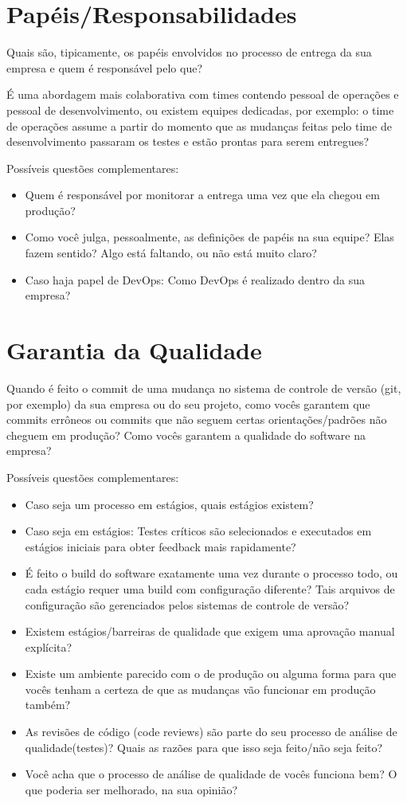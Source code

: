 \section{Papéis/Responsabilidades}
Quais são, tipicamente, os papéis envolvidos no processo de entrega da sua empresa e quem é responsável pelo que?


É uma abordagem mais colaborativa com times contendo pessoal de operações e pessoal de desenvolvimento, ou existem equipes dedicadas, por exemplo: o time de operações assume a partir do momento que as mudanças feitas pelo time de desenvolvimento passaram os testes e estão prontas para serem entregues?

Possíveis questões complementares:
\begin{itemize}
	\item Quem é responsável por monitorar a entrega uma vez que ela chegou em produção?
	\item Como você julga, pessoalmente, as definições de papéis na sua equipe? Elas fazem sentido? Algo está faltando, ou não está muito claro?
	\item Caso haja papel de DevOps: Como DevOps é realizado dentro da sua empresa?
\end{itemize}

\section{Garantia da Qualidade}

Quando é feito o commit de uma mudança no sistema de controle de versão (git, por exemplo) da sua empresa ou do seu projeto, como vocês garantem que commits errôneos ou commits que não seguem certas orientações/padrões não cheguem em produção? Como vocês garantem a qualidade do software na empresa?

Possíveis questões complementares:
\begin{itemize}
	\item Caso seja um processo em estágios, quais estágios existem?
	\item Caso seja em estágios: Testes críticos são selecionados e executados em estágios iniciais para obter feedback mais rapidamente?
	\item É feito o build do software exatamente uma vez durante o processo todo, ou cada estágio requer uma build com configuração diferente? Tais arquivos de configuração são gerenciados pelos sistemas de controle de versão?
	\item Existem estágios/barreiras de qualidade que exigem uma aprovação manual explícita?
	\item Existe um ambiente parecido com o de produção ou alguma forma para que vocês tenham a certeza de que as mudanças vão funcionar em produção também?
	\item As revisões de código (code reviews) são parte do seu processo de análise de qualidade(testes)? Quais as razões para que isso seja feito/não seja feito?
	\item Você acha que o processo de análise de qualidade de vocês funciona bem? O que poderia ser melhorado, na sua opinião?
\end{itemize}


